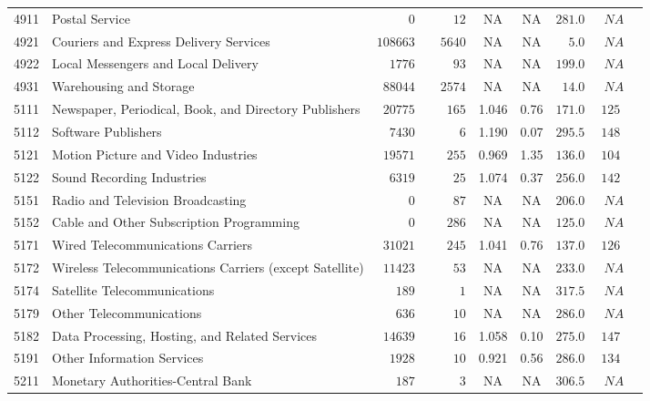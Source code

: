 \documentclass[9pt, oneside]{article}   	%
\begin{document}
\begin{longtable}{lp{3 in}ccccccc}
4911  & Postal Service & $\phantom{00000}0$ & $\phantom{0000}12$ &    NA &    NA & $281.0$ & $\phantom{0}NA$ \\
4921  & Couriers and Express Delivery Services & $108663$ & $\phantom{00}5640$ &    NA &    NA & $\phantom{00}5.0$ & $\phantom{0}NA$ \\
4922  & Local Messengers and Local Delivery & $\phantom{00}1776$ & $\phantom{0000}93$ &    NA &    NA & $199.0$ & $\phantom{0}NA$ \\
4931  & Warehousing and Storage & $\phantom{0}88044$ & $\phantom{00}2574$ &    NA &    NA & $\phantom{0}14.0$ & $\phantom{0}NA$ \\
5111  & Newspaper, Periodical, Book, and Directory Publishers & $\phantom{0}20775$ & $\phantom{000}165$ & 1.046 &  0.76 & $171.0$ & $125$ \\
5112  & Software Publishers & $\phantom{00}7430$ & $\phantom{00000}6$ & 1.190 &  0.07 & $295.5$ & $148$ \\
5121  & Motion Picture and Video Industries & $\phantom{0}19571$ & $\phantom{000}255$ & 0.969 &  1.35 & $136.0$ & $104$ \\
5122  & Sound Recording Industries & $\phantom{00}6319$ & $\phantom{0000}25$ & 1.074 &  0.37 & $256.0$ & $142$ \\
5151  & Radio and Television Broadcasting & $\phantom{00000}0$ & $\phantom{0000}87$ &    NA &    NA & $206.0$ & $\phantom{0}NA$ \\
5152  & Cable and Other Subscription Programming & $\phantom{00000}0$ & $\phantom{000}286$ &    NA &    NA & $125.0$ & $\phantom{0}NA$ \\

5171  & Wired Telecommunications Carriers & $\phantom{0}31021$ & $\phantom{000}245$ & 1.041 &  0.76 & $137.0$ & $126$ \\
5172  & Wireless Telecommunications Carriers (except Satellite) & $\phantom{0}11423$ & $\phantom{0000}53$ &    NA &    NA & $233.0$ & $\phantom{0}NA$ \\
5174  & Satellite Telecommunications & $\phantom{000}189$ & $\phantom{00000}1$ &    NA &    NA & $317.5$ & $\phantom{0}NA$ \\
5179  & Other Telecommunications & $\phantom{000}636$ & $\phantom{0000}10$ &    NA &    NA & $286.0$ & $\phantom{0}NA$ \\
5182  & Data Processing, Hosting, and Related Services & $\phantom{0}14639$ & $\phantom{0000}16$ & 1.058 &  0.10 & $275.0$ & $147$ \\
5191  & Other Information Services & $\phantom{00}1928$ & $\phantom{0000}10$ & 0.921 &  0.56 & $286.0$ & $134$ \\
5211  & Monetary Authorities-Central Bank & $\phantom{000}187$ & $\phantom{00000}3$ &    NA &    NA & $306.5$ & $\phantom{0}NA$ \\


\end{longtable}
\end{document}
